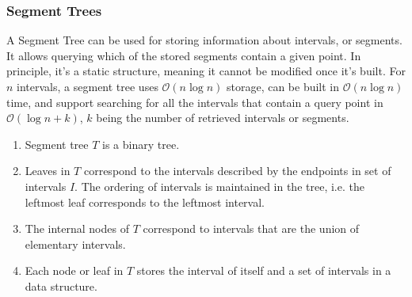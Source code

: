 \documentclass{article}
\newcommand{\bigO}{\mathcal{O}}
\begin{document}
    \subsubsection{Segment Trees}
    A Segment Tree can be used for storing information about intervals, or segments. It allows querying which of the stored segments contain a given point. In principle, it's a static structure, meaning it cannot be modified once it's built. For $n$ intervals, a segment tree uses $\bigO(n \log n)$ storage, can be built in $\bigO(n \log n)$ time, and support searching for all the intervals that contain a query point in $\bigO(\log n + k)$, $k$ being the number of retrieved intervals or segments. 
    \begin{enumerate}
        \item Segment tree $T$ is a binary tree.
        \item Leaves in $T$ correspond to the intervals described by the endpoints in set of intervals $I$. The ordering of intervals is maintained in the tree, i.e. the leftmost leaf corresponds to the leftmost interval.
        \item The internal nodes of $T$ correspond to intervals that are the union of elementary intervals.
        \item Each node or leaf in $T$ stores the interval of itself and a set of intervals in a data structure.
    \end{enumerate}
    
\end{document}
